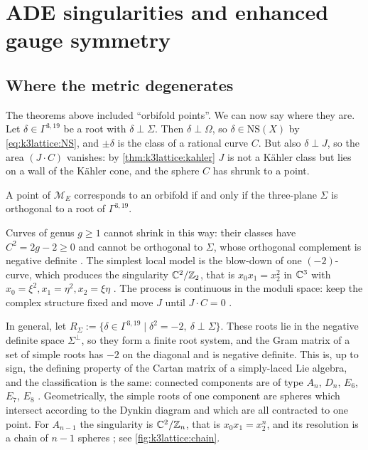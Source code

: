 \section{ADE singularities and enhanced gauge symmetry}\label{sec:k3lattice:ade}

\subsection{Where the metric degenerates}
The theorems above included ``orbifold points''. We can now say where they are. Let
$\delta\in\Gamma^{3,19}$ be a root with $\delta\perp\Sigma$. Then $\delta\perp\Omega$, so
$\delta\in\mathrm{NS}(X)$ by \eqref{eq:k3lattice:NS}, and $\pm\delta$ is the class of a
rational curve $C$. But also $\delta\perp J$, so the area $(J\cdot C)$ vanishes: by
\cref{thm:k3lattice:kahler} $J$ is not a Kähler class but lies on a wall of the Kähler cone,
and the sphere $C$ has shrunk to a point.

\begin{theorem}\label{thm:k3lattice:orbifold}
A point of $\mathcal M_E$ corresponds to an orbifold if and only if the three-plane $\Sigma$
is orthogonal to a root of $\Gamma^{3,19}$. \TL{}
\end{theorem}
Curves of genus $g\ge1$ cannot shrink in this way: their classes have $C^2=2g-2\ge0$ and
cannot be orthogonal to $\Sigma$, whose orthogonal complement is negative definite
. The simplest local model is the blow-down of one
$(-2)$-curve, which produces the singularity $\mathbb{C}^2/\mathbb{Z}_2$, that is $x_0x_1=x_2^2$ in $\mathbb{C}^3$
with $x_0=\xi^2,x_1=\eta^2,x_2=\xi\eta$ . The
process is continuous in the moduli space: keep the complex structure fixed and move $J$
until $J\cdot C=0$ .

In general, let $R_\Sigma:=\{\delta\in\Gamma^{3,19}\mid\delta^2=-2,\ \delta\perp\Sigma\}$.
These roots lie in the negative definite space $\Sigma^\perp$, so they form a finite root
system, and the Gram matrix of a set of simple roots has $-2$ on the diagonal and is negative
definite. This is, up to sign, the defining property of the Cartan matrix of a simply-laced
Lie algebra, and the classification is the same: connected components are of type $A_n$,
$D_n$, $E_6$, $E_7$, $E_8$ .
Geometrically, the simple roots of one component are spheres which intersect according to
the Dynkin diagram and which are all contracted to one point. For $A_{n-1}$ the singularity
is $\mathbb{C}^2/\mathbb{Z}_n$, that is $x_0x_1=x_2^n$, and its resolution is a chain of $n-1$ spheres
; see \cref{fig:k3lattice:chain}.

